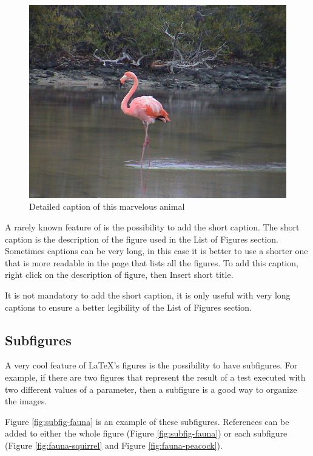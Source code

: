 \begin{figure}[h]
\begin{centering}
\includegraphics[width=0.5\columnwidth]{chapter-2/images/flamingo}
\par\end{centering}
\caption[Short caption of the figure]{\label{fig:image}Detailed caption of this marvelous animal}
\end{figure}
A rarely known feature of \LyX{} is the possibility to add the short
caption. The short caption is the description of the figure used in
the \textsf{List of Figures} section. Sometimes captions can be very
long, in this case it is better to use a shorter one that is more
readable in the page that lists all the figures. To add this caption,
right click on the description of figure, then \textsf{Insert short
title}.

It is not mandatory to add the short caption, it is only useful with
very long captions to ensure a better legibility of the \textsf{List
of Figures} section.

\subsection{Subfigures}

A very cool feature of \LaTeX 's figures is the possibility to have
subfigures. For example, if there are two figures that represent the
result of a test executed with two different values of a parameter,
then a subfigure is a good way to organize the images.

Figure \ref{fig:subfig-fauna} is an example of these subfigures.
References can be added to either the whole figure (Figure \ref{fig:subfig-fauna})
or each subfigure (Figure \ref{fig:fauna-squirrel} and Figure \ref{fig:fauna-peacock}).

